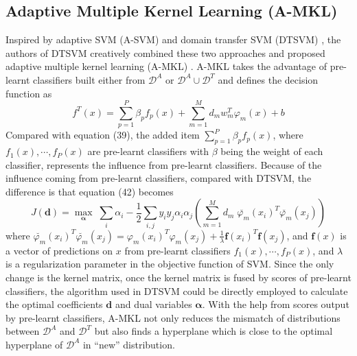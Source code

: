 \subsection{Adaptive Multiple Kernel Learning (A-MKL)}
Inspired by adaptive SVM (A-SVM) \cite{yang2007cross} and domain transfer SVM (DTSVM) \cite{duan2009domain}, the authors of DTSVM creatively combined these two approaches and proposed adaptive multiple kernel learning (A-MKL) \cite{duan2012visual}.  A-MKL takes the advantage of pre-learnt classifiers built either from $\mathcal{D}^A$ or $\mathcal{D}^A \cup \mathcal{D}^T$ and defines the decision function as
\begin{equation}
f^T(x) = \sum_{p=1}^{P} \beta_p f_p(x) + \sum_{m=1}^{M} d_m w_m^T \varphi_m(x) + b 
\end{equation}
Compared with equation (39), the added item $\sum_{p=1}^{P} \beta_p f_p(x)$, where $f_1(x), \cdots, f_P(x)$ are pre-learnt classifiers with $\beta$ being the weight of each classifier, represents the influence from pre-learnt classifiers. Because of the influence coming from pre-learnt classifiers, compared with DTSVM, the difference is that equation (42) becomes
\begin{equation}
J(\mathbf{d}) = \underset{\boldsymbol{\alpha}}{\max} \; \sum_i \alpha_i - \frac{1}{2} \sum_{i,j} y_i y_j \alpha_i \alpha_j  (\sum_{m=1}^M d_m \; \breve{\varphi_m} (x_i) ^T \breve{\varphi_m} (x_j))           
\end{equation}
where $\breve{\varphi_m} (x_i) ^T \breve{\varphi_m} (x_j) = \varphi_m (x_i) ^T \varphi_m (x_j) + \frac{1}{\lambda} \boldsymbol{f} (x_i)^T \boldsymbol{f}  (x_j)$, and $\boldsymbol{f}(x)$ is a vector of predictions on $x$ from pre-learnt classifiers $f_1(x), \cdots, f_P(x)$, and $\lambda$ is a regularization parameter in the objective function of SVM. Since the only change is the kernel matrix, once the kernel matrix is fused by scores of pre-learnt classifiers, the algorithm used in DTSVM could be directly employed to calculate the optimal coefficients $\mathbf{d}$ and dual variables $\boldsymbol{\alpha}$. With the help from scores output by pre-learnt classifiers, A-MKL not only reduces the mismatch of distributions between $\mathcal{D}^A$ and $\mathcal{D}^T$ but also finds a hyperplane which is close to the optimal hyperplane of $\mathcal{D}^A$ in ``new'' distribution. 
